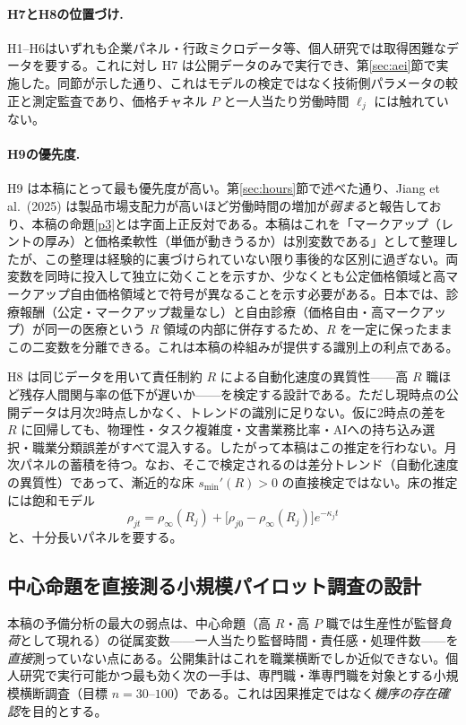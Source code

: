 \documentclass[11pt]{article}
\theoremstyle{plain}
\theoremstyle{definition}
\theoremstyle{remark}
\begin{document}
\paragraph{H7とH8の位置づけ.}
H1--H6はいずれも企業パネル・行政ミクロデータ等、個人研究では取得困難なデータを要する。これに対し H7 は公開データのみで実行でき、第\ref{sec:aei}節で実施した。同節が示した通り、これはモデルの検定ではなく技術側パラメータの較正と測定監査であり、価格チャネル $P$ と一人当たり労働時間 $\ell_j$ には触れていない。

\paragraph{H9の優先度.}
H9 は本稿にとって最も優先度が高い。第\ref{sec:hours}節で述べた通り、Jiang et al.\ (2025) は製品市場支配力が高いほど労働時間の増加が\emph{弱まる}と報告しており、本稿の命題\ref{p3}とは字面上正反対である。本稿はこれを「マークアップ（レントの厚み）と価格柔軟性（単価が動きうるか）は別変数である」として整理したが、この整理は経験的に裏づけられていない限り事後的な区別に過ぎない。両変数を同時に投入して独立に効くことを示すか、少なくとも公定価格領域と高マークアップ自由価格領域とで符号が異なることを示す必要がある。日本では、診療報酬（公定・マークアップ裁量なし）と自由診療（価格自由・高マークアップ）が同一の医療という $R$ 領域の内部に併存するため、$R$ を一定に保ったままこの二変数を分離できる。これは本稿の枠組みが提供する識別上の利点である。

H8 は同じデータを用いて責任制約 $R$ による自動化速度の異質性——高 $R$ 職ほど残存人間関与率の低下が遅いか——を検定する設計である。ただし現時点の公開データは月次2時点しかなく、トレンドの識別に足りない。仮に2時点の差を $R$ に回帰しても、物理性・タスク複雑度・文書業務比率・AIへの持ち込み選択・職業分類誤差がすべて混入する。したがって本稿はこの推定を行わない。月次パネルの蓄積を待つ。なお、そこで検定されるのは差分トレンド（自動化速度の異質性）であって、漸近的な床 $s_{\min}'(R)>0$ の直接検定ではない。床の推定には飽和モデル
\[
\rho_{jt}=\rho_\infty(R_j)+\bigl[\rho_{j0}-\rho_\infty(R_j)\bigr]e^{-\kappa_j t}
\]
と、十分長いパネルを要する。

\subsection{中心命題を直接測る小規模パイロット調査の設計}\label{sec:survey}
本稿の予備分析の最大の弱点は、中心命題（高 $R$・高 $P$ 職では生産性が監督\emph{負荷}として現れる）の従属変数——一人当たり監督時間・責任感・処理件数——を\emph{直接}測っていない点にある。公開集計はこれを職業横断でしか近似できない。個人研究で実行可能かつ最も効く次の一手は、専門職・準専門職を対象とする小規模横断調査（目標 $n=30$--$100$）である。これは因果推定ではなく\emph{機序の存在確認}を目的とする。
\end{document}
